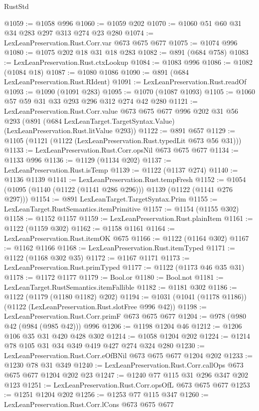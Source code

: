 \begin{lexlean}{RustStd}
\begin{coremodule}
@1059 := @1058 @996
@1060 := @1059 @202
@1070 := @1060 @51 @60 @31 @34 @283 @297 @313 @274 @23 @280
@1074 := LexLeanPreservation.Rust.Corr.var @673 @675 @677
@1075 := @1074 @996
@1080 := @1075 @202 @18 @31 @18 @283
@1082 := @891 (@684 @758)
@1083 := LexLeanPreservation.Rust.ctxLookup
@1084 := @1083 @996
@1086 := @1082 (@1084 @18)
@1087 := @1080 @1086
@1090 := @891 (@684 LexLeanPreservation.Rust.RIdent)
@1091 := LexLeanPreservation.Rust.readOf
@1093 := @1090 (@1091 @283)
@1095 := @1070 (@1087 @1093)
@1105 := @1060 @57 @59 @31 @33 @293 @296 @312 @274 @42 @280
@1121 := LexLeanPreservation.Rust.Corr.value
    @673
    @675
    @677
    @996
    @202
    @31
    @56
    @293
    (@891 (@684 LexLeanTarget.TargetSyntax.Value) (LexLeanPreservation.Rust.litValue @293))
@1122 := @891 @657
@1129 := @1105 (@1121 (@1122 (LexLeanPreservation.Rust.typedLit @673 @56 @31)))
@1133 := LexLeanPreservation.Rust.Corr.opsNil @673 @675 @677
@1134 := @1133 @996
@1136 := @1129 (@1134 @202)
@1137 := LexLeanPreservation.Rust.isTemp
@1139 := @1122 (@1137 @274)
@1140 := @1136 @1139
@1141 := LexLeanPreservation.Rust.tempFresh
@1152 := @1054 (@1095 (@1140 (@1122 (@1141 @286 @296))) @1139 (@1122 (@1141 @276 @297)))
@1154 := @891 LexLeanTarget.TargetSyntax.Prim
@1155 := LexLeanTarget.RustSemantics.itemPrimitive
@1157 := @1154 (@1155 @302)
@1158 := @1152 @1157
@1159 := LexLeanPreservation.Rust.plainItem
@1161 := @1122 (@1159 @302)
@1162 := @1158 @1161
@1164 := LexLeanPreservation.Rust.itemOK @675
@1166 := @1122 (@1164 @302)
@1167 := @1162 @1166
@1168 := LexLeanPreservation.Rust.itemTyped
@1171 := @1122 (@1168 @302 @35)
@1172 := @1167 @1171
@1173 := LexLeanPreservation.Rust.primTyped
@1177 := @1122 (@1173 @46 @35 @31)
@1178 := @1172 @1177
@1179 := Bool.or
@1180 := Bool.not
@1181 := LexLeanTarget.RustSemantics.itemFallible
@1182 := @1181 @302
@1186 := @1122 (@1179 (@1180 @1182) @202)
@1194 := @1031 (@1041 (@1178 @1186)) (@1122 (LexLeanPreservation.Rust.slotFree @996 @42))
@1198 := LexLeanPreservation.Rust.Corr.primF @673 @675 @677
@1204 := @978 (@980 @42 (@984 (@985 @42))) @996
@1206 := @1198 @1204 @46
@1212 := @1206 @106 @35 @31 @420 @428 @302
@1214 := @1058 @1204 @202
@1224 := @1214 @78 @105 @31 @34 @349 @419 @427 @274 @324 @280
@1230 := LexLeanPreservation.Rust.Corr.eOfBNil @673 @675 @677 @1204 @202
@1233 := @1230 @78 @31 @349
@1240 := LexLeanPreservation.Rust.Corr.callOps @673 @675 @677 @1204 @202 @23
@1247 := @1240 @77 @115 @31 @296 @347 @202 @123
@1251 := LexLeanPreservation.Rust.Corr.opsOfL @673 @675 @677
@1253 := @1251 @1204 @202
@1256 := @1253 @77 @115 @347
@1260 := LexLeanPreservation.Rust.Corr.lCons @673 @675 @677

\end{coremodule}
\end{lexlean}
